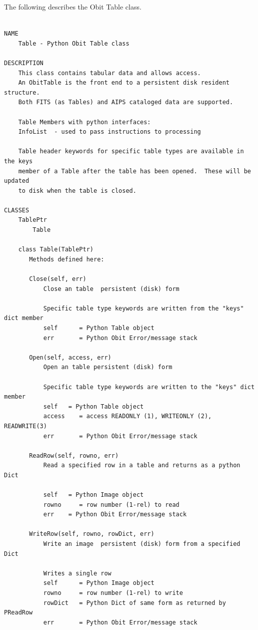 \documentclass[11pt]{report}
\begin{document}
The following describes the Obit Table class.
\begin{verbatim}

NAME
    Table - Python Obit Table class

DESCRIPTION
    This class contains tabular data and allows access.
    An ObitTable is the front end to a persistent disk resident structure.
    Both FITS (as Tables) and AIPS cataloged data are supported.
    
    Table Members with python interfaces:
    InfoList  - used to pass instructions to processing
    
    Table header keywords for specific table types are available in the keys
    member of a Table after the table has been opened.  These will be updated
    to disk when the table is closed.

CLASSES
    TablePtr
        Table
    
    class Table(TablePtr)
       Methods defined here:
       
       Close(self, err)
           Close an table  persistent (disk) form
           
           Specific table type keywords are written from the "keys" dict member
           self      = Python Table object
           err       = Python Obit Error/message stack
       
       Open(self, access, err)
           Open an table persistent (disk) form
           
           Specific table type keywords are written to the "keys" dict member
           self   = Python Table object
           access    = access READONLY (1), WRITEONLY (2), READWRITE(3)
           err       = Python Obit Error/message stack
       
       ReadRow(self, rowno, err)
           Read a specified row in a table and returns as a python Dict
           
           self   = Python Image object
           rowno     = row number (1-rel) to read
           err    = Python Obit Error/message stack
       
       WriteRow(self, rowno, rowDict, err)
           Write an image  persistent (disk) form from a specified Dict
           
           Writes a single row
           self      = Python Image object
           rowno     = row number (1-rel) to write
           rowDict   = Python Dict of same form as returned by PReadRow
           err       = Python Obit Error/message stack
       

\end{verbatim}
\end{document}
